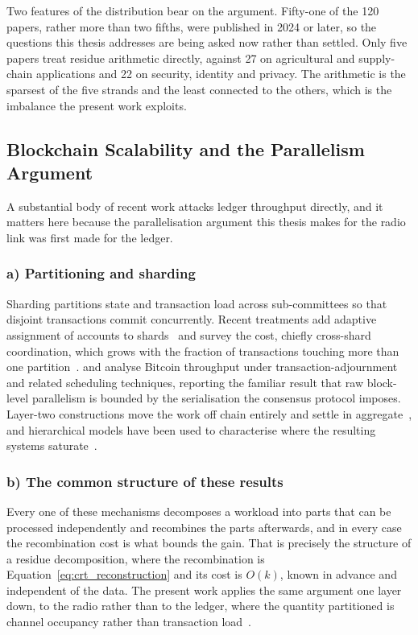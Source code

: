 \documentclass[12pt,a4paper,oneside]{book}
\begin{document}
Two features of the distribution bear on the argument. Fifty-one of the 120
papers, rather more than two fifths, were published in 2024 or later, so the
questions this thesis addresses are being asked now rather than settled. Only
five papers treat residue arithmetic directly, against 27 on agricultural and
supply-chain applications and 22 on security, identity and privacy. The
arithmetic is the sparsest of the five strands and the least connected to the
others, which is the imbalance the present work exploits.

\subsection{Blockchain Scalability and the Parallelism Argument}
\label{subsec:lit_scalability}

A substantial body of recent work attacks ledger throughput directly, and it
matters here because the parallelisation argument this thesis makes for the
radio link was first made for the ledger.

\subsubsection*{a) Partitioning and sharding}

Sharding partitions state and transaction load across sub-committees so that
disjoint transactions commit concurrently. Recent treatments add adaptive
assignment of accounts to shards~\cite{horvath2025assistedsharding} and survey
the cost, chiefly cross-shard coordination, which grows with the fraction of
transactions touching more than one partition~\cite{anonndscalabilitysolutions}.
\textcite{maiwada2024techniquesimprove} and
\textcite{maiwada2025blockchainscalability} analyse Bitcoin throughput under
transaction-adjournment and related scheduling techniques, reporting the
familiar result that raw block-level parallelism is bounded by the
serialisation the consensus protocol imposes. Layer-two constructions move the
work off chain entirely and settle in
aggregate~\cite{patel2023blockchainlayer}, and hierarchical models have been
used to characterise where the resulting systems
saturate~\cite{sadath2024scalabilityperformance}.

\subsubsection*{b) The common structure of these results}

Every one of these mechanisms decomposes a workload into parts that can be
processed independently and recombines the parts afterwards, and in every case
the recombination cost is what bounds the gain. That is precisely the structure
of a residue decomposition, where the recombination is
Equation~\ref{eq:crt_reconstruction} and its cost is $O(k)$, known in advance
and independent of the data. The present work applies the same argument one
layer down, to the radio rather than to the ledger, where the quantity
partitioned is channel occupancy rather than transaction
load~\cite{forcha2026basedparallel}.
\end{document}
